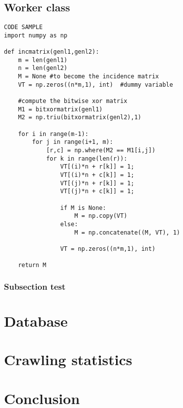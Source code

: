 \documentclass[runningheads]{llncs}
\begin{document}
\subsection{Worker class}
\begin{lstlisting}
CODE SAMPLE
import numpy as np
 
def incmatrix(genl1,genl2):
    m = len(genl1)
    n = len(genl2)
    M = None #to become the incidence matrix
    VT = np.zeros((n*m,1), int)  #dummy variable
 
    #compute the bitwise xor matrix
    M1 = bitxormatrix(genl1)
    M2 = np.triu(bitxormatrix(genl2),1) 
 
    for i in range(m-1):
        for j in range(i+1, m):
            [r,c] = np.where(M2 == M1[i,j])
            for k in range(len(r)):
                VT[(i)*n + r[k]] = 1;
                VT[(i)*n + c[k]] = 1;
                VT[(j)*n + r[k]] = 1;
                VT[(j)*n + c[k]] = 1;
 
                if M is None:
                    M = np.copy(VT)
                else:
                    M = np.concatenate((M, VT), 1)
 
                VT = np.zeros((n*m,1), int)
 
    return M
\end{lstlisting}

\subsubsection{Subsection test}

\section{Database}

\section{Crawling statistics}

\section{Conclusion}

 
 
 
\end{document}
